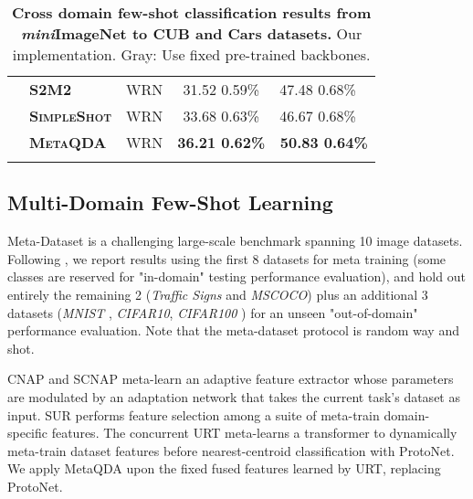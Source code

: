 \documentclass[10pt,twocolumn,letterpaper]{article}
\def\miniIN{\textit{mini}ImageNet}
\begin{document}
\begin{table}[t]
{\begin{tabular}{@{} cllcc @{}}
\cmidrule{2-5}
&\cellcolor{Gray}\textbf{\textsc{S2M2}}  \cite{mangla2020charting} & \cellcolor{Gray} WRN & \cellcolor{Gray} 31.52  0.59\% & \cellcolor{Gray} 47.48  0.68\% \ \\
&\cellcolor{Gray}\textbf{\textsc{SimpleShot}} \cite{wang2019simpleshot} & \cellcolor{Gray}  WRN & \cellcolor{Gray} 33.68  0.63\%  & \cellcolor{Gray} 46.67  0.68\% \ \\
&\cellcolor{Gray}\textbf{\textsc{MetaQDA}} & \cellcolor{Gray} WRN &  \cellcolor{Gray} \textbf{36.21  0.62\%} & \cellcolor{Gray} \textbf{50.83  0.64\%} \\

\bottomrule \\
\end{tabular}
}

\caption{\small \small
\textbf{Cross domain few-shot classification results from \miniIN{} to CUB and Cars datasets.}  Our implementation. Gray: Use fixed pre-trained backbones.
}
\vspace{-1.5em}
\label{tab:cdfsl}
\end{table}


\subsection{Multi-Domain Few-Shot Learning}

Meta-Dataset \cite{triantafillou2019meta} is a challenging large-scale benchmark spanning 10 image datasets. Following \cite{requeima2019cnaps, bateni2020improved}, we report results using the first 8 datasets for meta training (some classes are reserved for "in-domain" testing performance evaluation), and hold out entirely the remaining 2 (\textit{Traffic Signs} and \textit{MSCOCO}) plus an additional 3 datasets (\textit{MNIST} \cite{lecun2010mnist}, \textit{CIFAR10}, \textit{CIFAR100} \cite{krizhevsky2009learning}) for an unseen "out-of-domain" performance evaluation. Note that the meta-dataset protocol is random way and shot.

  CNAP \cite{requeima2019cnaps} and SCNAP \cite{bateni2020improved} meta-learn an adaptive feature extractor whose parameters are modulated by an adaptation network that takes the current task’s dataset as input. SUR \cite{dvornik2020selecting}  performs feature selection among a suite of meta-train domain-specific features. The concurrent URT \cite{liu2020universal} meta-learns a transformer to dynamically meta-train dataset features before nearest-centroid classification with ProtoNet. We apply MetaQDA upon the fixed fused features learned by URT, replacing ProtoNet. 
\end{document}
